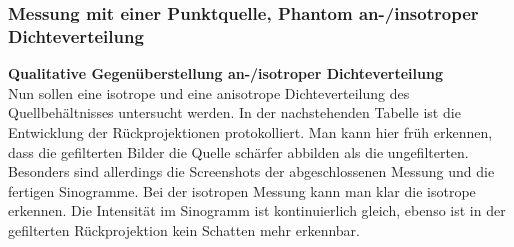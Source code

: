         \subsubsection{Messung mit einer Punktquelle, Phantom an-/insotroper Dichteverteilung}
        
        \textbf{Qualitative Gegenüberstellung an-/isotroper Dichteverteilung}\\
        Nun sollen eine isotrope und eine anisotrope Dichteverteilung des Quellbehältnisses untersucht werden. In der nachstehenden Tabelle ist die Entwicklung der Rückprojektionen
        protokolliert. Man kann hier früh erkennen, dass die gefilterten Bilder die Quelle schärfer abbilden als die ungefilterten. Besonders sind allerdings die Screenshots 
        der abgeschlossenen Messung und  die fertigen Sinogramme. Bei der isotropen Messung kann man klar die isotrope erkennen. Die Intensität im Sinogramm ist kontinuierlich gleich,
        ebenso ist in der gefilterten Rückprojektion kein Schatten mehr erkennbar. 
 
